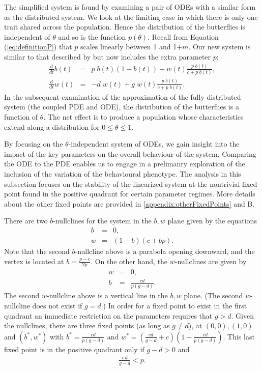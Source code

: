 \documentclass[review,authoryear]{elsarticle}
\begin{document}
The simplified system is found by examining a pair of ODEs with a similar form
as the distributed system. We look at the limiting case in which there is only one trait shared across the population. Hence the distribution of the
butterflies is independent of $\theta$ and so is the function $p(\theta)$. Recall from Equation (\ref{eq:definitionP}) that $p$ scales linearly between 1 and 1+$m$.
Our new system is similar to that described by \cite{TEWA20134825} but now
includes the extra parameter $p$:
\begin{eqnarray}
  \label{eq:scaledODE1}
  \frac{d}{dt} b(t) & = &
      p\; b(t) (1 - b(t))
      -  w(t) \frac{p\; b(t)}{c+p\; b(t)}, \\
  \label{eq:scaledODE2}
  \frac{d}{dt} w(t) & = & -d \; w(t) +
       g \; w(t) \frac{p\; b(t) }{c + p\; b(t)}.
\end{eqnarray}
In the subsequent examination of the approximation of the fully distributed system (the coupled PDE and ODE), the distribution of the butterflies is a function of $\theta$. The net effect is to produce a population whose characteristics extend along a distribution for $0\leq\theta\leq 1$.

By focusing on the $\theta$-independent system of ODEs, we gain insight into the impact of the key parameters on the overall behaviour of the system. Comparing the ODE to the PDE enables us to engage in a prelimanry exploration of the inclusion of the variation of the behavioural phenotype.  The analysis in
this subsection focuses on the stability of the linearized system at the
nontrivial fixed point found in the positive quadrant for certain parameter regimes. More details about the other fixed points are
provided in  \ref{appendix:otherFixedPoints} and  B.

There are two $b$-nullclines for the system in the $b,w$ plane given by the equations
\begin{eqnarray}
  \label{eq:bnullclines}
  b & = & 0, \\
  w & = & (1-b)(c+b p).
\end{eqnarray}
Note that the second $b$-nullcline above is a parabola opening downward, and the vertex is located at
$b=\frac{p-c}{2p}$. On the other hand, the $w$-nullclines are given by
\begin{eqnarray}
  \label{eq:wnullclines}
  w & = & 0, \\
  b & = & \frac{cd}{p(g-d)}.
\end{eqnarray}
The second $w$-nullcline above is a vertical line in the $b,w$ plane. (The second $w$-nullcline does not exist if $g=d$.) In
order for a fixed point to exist in the first quadrant an immediate
restriction on the parameters requires that $g>d$.  Given the
nullclines, there are three fixed points (as long as $g\ne d$), at $(0,0), (1,0)$ and $(b^*,w^*)$ with $b^*=\frac{cd}{p (g-d)}$ and
$w^*=\left(\frac{cd}{g-d}+c\right)\left(1-\frac{cd}{p (g-d)}\right)$.  This last fixed point is in the positive quadrant only if $g-d>0$ and
\begin{eqnarray}
\label{eqn:positivityRequirement}
\frac{c\,d}{g-d}<p.
\end{eqnarray}
\end{document}
